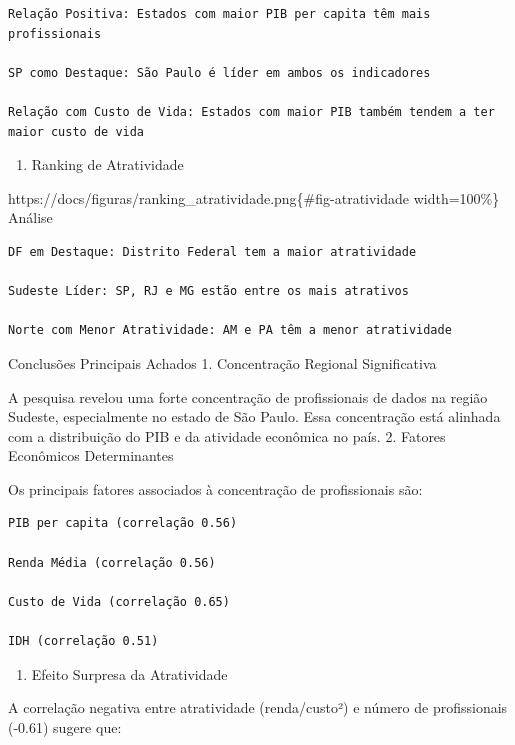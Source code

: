 \documentclass[
  11pt,
  letterpaper,
  DIV=11,
  numbers=noendperiod]{scrartcl}
\providecommand{\tightlist}{%
  \setlength{\itemsep}{0pt}\setlength{\parskip}{0pt}}
\begin{document}
\begin{verbatim}
Relação Positiva: Estados com maior PIB per capita têm mais profissionais

SP como Destaque: São Paulo é líder em ambos os indicadores

Relação com Custo de Vida: Estados com maior PIB também tendem a ter maior custo de vida
\end{verbatim}

\begin{enumerate}
\def\labelenumi{\arabic{enumi}.}
\setcounter{enumi}{5}
\tightlist
\item
  Ranking de Atratividade
\end{enumerate}

https://docs/figuras/ranking\_atratividade.png\{\#fig-atratividade
width=100\%\} Análise

\begin{verbatim}
DF em Destaque: Distrito Federal tem a maior atratividade

Sudeste Líder: SP, RJ e MG estão entre os mais atrativos

Norte com Menor Atratividade: AM e PA têm a menor atratividade
\end{verbatim}

Conclusões Principais Achados 1. Concentração Regional Significativa

A pesquisa revelou uma forte concentração de profissionais de dados na
região Sudeste, especialmente no estado de São Paulo. Essa concentração
está alinhada com a distribuição do PIB e da atividade econômica no
país. 2. Fatores Econômicos Determinantes

Os principais fatores associados à concentração de profissionais são:

\begin{verbatim}
PIB per capita (correlação 0.56)

Renda Média (correlação 0.56)

Custo de Vida (correlação 0.65)

IDH (correlação 0.51)
\end{verbatim}

\begin{enumerate}
\def\labelenumi{\arabic{enumi}.}
\setcounter{enumi}{2}
\tightlist
\item
  Efeito Surpresa da Atratividade
\end{enumerate}

A correlação negativa entre atratividade (renda/custo²) e número de
profissionais (-0.61) sugere que:
\end{document}
